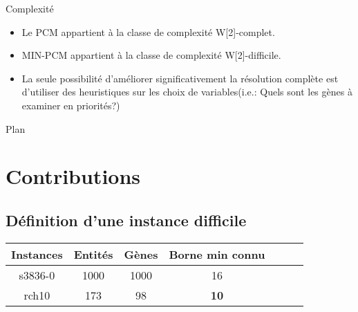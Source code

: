 \documentclass{beamer}
\begin{document}
\begin{frame}
	\begin{alertblock}{Complexité}
			\begin{itemize}
				\item Le PCM appartient à la classe de complexité W[2]-complet.
				\pause
				\item MIN-PCM appartient à la classe de complexité W[2]-difficile.
				\pause
				\item La seule possibilité d'améliorer significativement la résolution complète est d'utiliser des heuristiques sur les choix de variables(i.e.: Quels sont les gènes à examiner en priorités?)
			\end{itemize}
	\end{alertblock}
\end{frame}

\begin{frame}{Plan}
	\tableofcontents
\end{frame}

\section*{Contributions}

\subsection{Définition d'une instance difficile}
\begin{frame}{}%
	\begin{center}
		\begin{tabular}{|c|c|c|c|c|c|c|}
		\hline 
		Instances & Entités & Gènes & Borne min connu \\ 
		\hline 
		s3836-0 & 1000 & 1000 & 16\\ 
		\hline
		rch10 & 173 & 98 & \textbf{10} \\ 
		\hline
		\end{tabular} 
	\end{center}
	
	\begin{overprint}
		{
			\begin{figure}
				
			\end{figure}
		}
		{
			\begin{figure}
				
			\end{figure}
		}
	\end{overprint} 
\end{frame}
\end{document}
